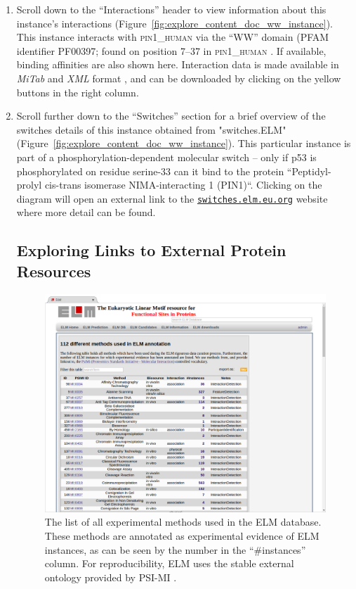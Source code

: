 \documentclass[12pt]{article}
\newcommand\rurl[1]{%
	\href{http://#1}{\nolinkurl{#1}}%
}
\newcommand\uniprot[1]{%
	\textsc{\lowercase{#1}}%
}
\newcommand\fileformat[1]{%
    \textit{#1}{}%
}%
\begin{document}
\begin{enumerate}
\item Scroll down to the ``Interactions'' header to view information about this
	instance's interactions
	(Figure~\ref{fig:explore_content_doc_ww_instance}). This instance
	interacts with \uniprot{PIN1\_Human} via the ``WW'' domain (PFAM identifier
	PF00397; found on position 7--37 in \uniprot{PIN1\_Human}. If available,
	binding affinities are also shown here. Interaction data is made
	available in \fileformat{MiTab} and \fileformat{XML} format
	\citep{17925023}, and can be downloaded by clicking on the yellow
	buttons in the right column.

\item Scroll further down to the ``Switches'' section for a brief overview of
	the switches details of this instance obtained from "switches.ELM"
	\citep{23550212} (Figure~\ref{fig:explore_content_doc_ww_instance}). This
	particular instance is part of a phosphorylation-dependent molecular switch --
	only if p53 is phosphorylated on residue serine-33 can it bind to the protein
	``Peptidyl-prolyl cis-trans isomerase NIMA-interacting 1 (PIN1)``.
	Clicking on the diagram will open an external link to the
	\rurl{switches.elm.eu.org} website where more detail can be found.

%
%
\subsection*{Exploring Links to External Protein Resources}
\label{subsec:explore_content_links_to_external_resources}

\begin{figure}[h!]
	\centering
	\includegraphics[width=\textwidth]{Figures/explore_content/methods.png}
	\caption{
		The list of all experimental methods used in the ELM database.
		These methods are annotated as experimental evidence of ELM
		instances, as can be seen by the number in the ``#instances''
		column. For reproducibility, ELM uses the stable external
		ontology provided by PSI-MI \citep{17925023}.
	}
	\label{fig:explore_content_methods}
\end{figure}


\end{enumerate}
\end{document}
